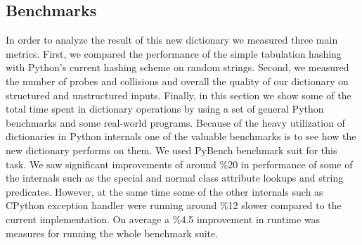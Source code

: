 \documentclass[11pt]{article}
\begin{document}
\subsection{Benchmarks}
In order to analyze the result of this new dictionary we measured three main metrics. First, we compared the performance of the simple tabulation hashing with Python’s current hashing scheme on random strings. Second, we measured the number of probes and collisions and overall the quality of our dictionary on structured and unstructured inputs. Finally, in this section  we show some of the total time spent in dictionary operations by using a set of general Python benchmarks and some real-world programs.
Because of the heavy utilization of dictionaries in Python internals one of the valuable benchmarks is to see how the new dictionary performs on them. We used PyBench benchmark suit for this task. We saw significant improvements of around \%20 in performance of some of the internals such as the special and normal class attribute lookups and string predicates. However, at the same time some of the other internals such as CPython exception handler were running around \%12 slower compared to the current implementation. On average a \%4.5 improvement in runtime was measures for running the whole benchmark suite.
\end{document}
